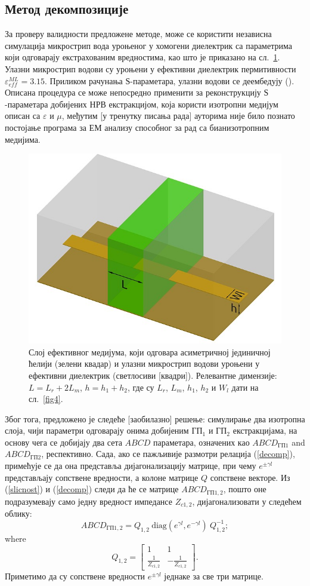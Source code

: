 \documentclass[main.tex]{subfiles}
\begin{document}
\subsection{Метод декомпозиције}
За проверу валидности предложене методе, може се користити независна симулација микрострип вода уроњеног у хомогени диелектрик са параметрима који одговарају екстрахованим вредностима, као што је приказано на сл.~\ref{slab}. Улазни микрострип водови су уроњени у ефективни диелектрик пермитивности $\varepsilon^{ML}_{eff}=\num{3.15}$. Приликом рачунања $Ѕ$-параметара, улазни водови се деембедују (). Описана процедура се може непосредно применити за реконструкцију $Ѕ$-параметара добијених НРВ екстракцијом, која користи изотропни медијум описан са $\varepsilon$ и $\mu$, међутим [у тренутку писања рада] ауторима није било познато постојање програма за ЕМ анализу способног за рад са бианизотропним медијима.
\begin{figure}[!t]
\centering
\includegraphics[width=0.6\columnwidth]{slike/slab.jpeg}
\caption{Слој ефективног медијума, који одговара асиметричној јединичној ћелији (зелени квадар) и улазни микрострип водови уроњени у ефективни диелектрик (светлосиви [квадри]). Релевантне димензије: $L=L_r+2L_m$, $h=h_1+h_2$, где су $L_r$, $L_m$, $h_1$, $h_2$ и $W_l$ дати на сл.~\ref{fig4}.}
\label{slab}
\end{figure}

Због тога, предложено је следеће [заобилазно] решење: симулирање два изотропна слоја, чији параметри одговарају онима добијеним $ГП_1$ и $ГП_2$ екстракцијама, на основу чега се добијају два сета $ABCD$ параметара, означених као $ABCD_{ГП1}$ and $ABCD_{ГП2}$, респективно. Сада, ако се пажљивије размотри релација (\ref{decomp}), примећује се да она представља дијагонализацију матрице, при чему $e^{\pm \gamma l}$ представљају сопствене вредности, а колоне матрице $Q$ сопствене векторе. Из (\ref{slicnost}) и (\ref{decomp}) следи да ће се матрице $ABCD_{ГП1,2}$, пошто оне подразумевају само једну вредност импедансе $Z_{c1,2}$, дијагонализовати у следећем облику:
\begin{equation}\label{decomp2}
ABCD_{ГП1,2} = Q_{1,2}\: \mathrm{diag}(e^{\gamma l},e^{-\gamma l})\: Q_{1,2}^{-1};
\end{equation}
where
\begin{equation}
Q_{1,2} = 
\begin{bmatrix}
1 & 1 \\
\frac{1}{Z_{c1,2}} & -\frac{1}{Z_{c1,2}}
\end{bmatrix}.
\end{equation}
Приметимо да су сопствене вредности $e^{\pm \gamma l}$ једнаке за све три матрице.
\end{document}
